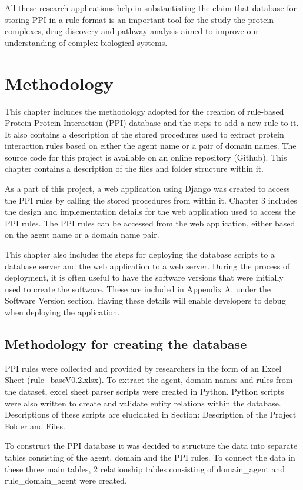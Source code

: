 \documentclass[msc,deptreport,ai]{infthesis}      %
\begin{document}
All these research applications help in substantiating the claim that database for storing PPI in a rule format is an important tool for the study the protein complexes, drug discovery and pathway analysis aimed to improve our understanding of complex biological systems.
 

\chapter{Methodology}
This chapter includes the methodology adopted for the creation of rule-based Protein-Protein Interaction (PPI) database and the steps to add a new rule to it. It also contains a description of the stored procedures used to extract protein interaction rules based on either the agent name or a pair of domain names. The source code for this project is available on an online repository (Github). This chapter contains a description of the files and folder structure within it. 

As a part of this project, a web application using Django \cite{django} was created to access the PPI rules by calling the stored procedures from within it. Chapter 3 includes the design and implementation details for the web application used to access the PPI rules. The PPI rules can be accessed from the web application, either based on the agent name or a domain name pair. 

This chapter also includes the steps for deploying the database scripts to a database server and the web application to a web server. During the process of deployment, it is often useful to have the software versions that were initially used to create the software. These are included in Appendix A, under the Software Version section. Having these details will enable developers to debug when deploying the application.

\section{Methodology for creating the database}
PPI rules were collected and provided by researchers in the form of an Excel Sheet (rule\_baseV0.2.xlsx). To extract the agent, domain names and rules from the dataset, excel sheet parser scripts were created in Python. Python scripts were also written to create and validate entity relations within the database. Descriptions of these scripts are elucidated in Section: Description of the Project Folder and Files.

To construct the PPI database it was decided to structure the data into separate tables consisting of the agent, domain and the PPI rules. To connect the data in these three main tables, 2 relationship tables consisting of domain\_agent and rule\_domain\_agent were created.
\end{document}

